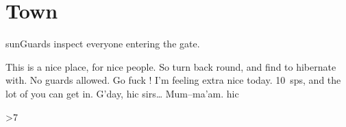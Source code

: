 \section*{Town}

\begin{multicols}{2}

{\sffamily \Glspl{sunGuard} inspect everyone entering the gate.}

\begin{exampletext}
\ifcase\value{temperature}
  This is a nice place, for nice people.
  So turn back round, and find  to hibernate with.
\or
  No \glspl{guard} allowed.
  Go fuck !
\or
  I'm feeling extra nice today.
  10~\glspl{sp}, and the lot of you can get in.
\else
  G'day, {\tiny hic} sirs\ldots
  Mum--ma'am.
  {\tiny hic}
\fi
\end{exampletext}

\townArmoury

\townDocks

\townWeavers

\townHealers

\townTanner

\townGuardArms

\fightAdvert

\end{multicols}

\townGuardProjectiles

\bigLine

\begin{multicols}{3}

\docksNote

\townCuriosity

\rotatebox{\value{rn1t2}}{\townSignage}

\townBeasts

\townSquare

\innOne

\tavernOne

\tavernTwo

\innTwo

\townPitOfJustice

\randomize
\ifnum\value{r12}>7
\fi

\end{multicols}

